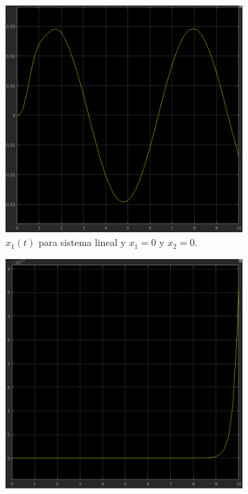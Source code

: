 \documentclass[12pt, letterpaper]{article}
\begin{document}
\begin{figure}[H]
	\centering
	\begin{subfigure}[b]{0.49\linewidth}
		\includegraphics[width=\linewidth]{1.png}
		\caption{$x_1(t)$ para sistema lineal y $x_1 = 0$ y $x_2 = 0$.}
	\end{subfigure}
	\begin{subfigure}[b]{0.49\linewidth}
		\includegraphics[width=\linewidth]{2.png}

\end{subfigure}
\end{figure}
\end{document}
